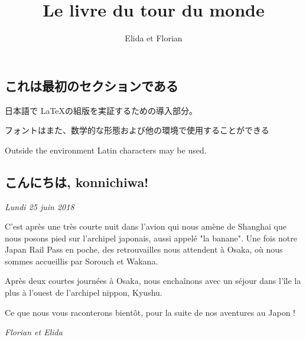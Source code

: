 \documentclass{article}
\title{Le livre du tour du monde}
\author{Elida et Florian}
\begin{document}
\maketitle
\tableofcontents

\begin{CJK}{UTF8}{min}
\section{これは最初のセクションである}
日本語で \LaTeX の組版を実証するための導入部分。

フォントはまた、数学的な形態および他の環境で使用することができる
\end{CJK}

\bigskip

Outside the environment Latin characters may be used.

\begin{CJK}{UTF8}{min}
\section{\textnormal{こんにちは}, konnichiwa!}
\end{CJK}

\emph{Lundi 25 juin 2018}

C'est après une très courte nuit dans l'avion qui nous amène de Shanghai
que nous posons pied sur l'archipel japonais, aussi appelé "la banane".
Une fois notre Japan Rail Pass en poche, des retrouvailles nous
attendent à Osaka, où nous sommes accueillis par Sorouch et Wakana.



Après deux courtes journées à Osaka, nous enchaînons avec un séjour dans
l'île la plus à l'ouest de l'archipel nippon, Kyushu.

Ce que nous vous raconterons bientôt, pour la suite de nos aventures au
Japon !

\emph{Florian et Elida}
\end{document}
